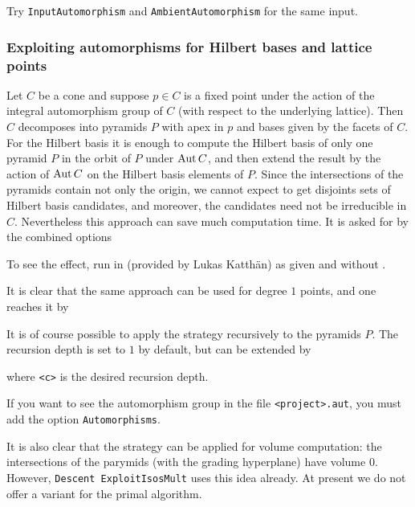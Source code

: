 Try \verb|InputAutomorphism| and \verb|AmbientAutomorphism| for the same input.

\subsubsection{Exploiting automorphisms for Hilbert bases and lattice points}

Let $C$ be a cone and suppose $p\in C$ is a fixed point under the action of the integral automorphism group of $C$ (with respect to the underlying lattice). Then $C$ decomposes into pyramids $P$ with apex in $p$ and bases given by the facets of $C$. For the Hilbert basis it is enough to compute the Hilbert basis of only one pyramid $P$ in the orbit of $P$ under $\operatorname{Aut} C$, and then extend the result by the action of $\operatorname{Aut} C$ on the Hilbert basis elements of $P$. Since the intersections of the pyramids contain not only the origin, we cannot expect to get disjoints sets of Hilbert basis candidates, and moreover, the candidates need not be irreducible in $C$. Nevertheless this approach can save much computation time. It is asked for by the combined options
\begin{itemize}
\end{itemize}
To see the effect, run  in  (provided by Lukas Katthän) as given and without .

It is clear that the same approach can be used for degree $1$ points, and one reaches it by
\begin{itemize}
\end{itemize}

It is of course possible to apply the strategy recursively  to the pyramids $P$. The recursion depth is set to $1$ by default, but can be extended by 
\begin{itemize}
\end{itemize}
where \verb*|<c>| is the desired recursion depth.

If you want to see the automorphism group in the file \verb|<project>.aut|, you must add the option \verb|Automorphisms|.

It is also clear that the strategy can be applied for volume computation: the intersections of the parymids (with the grading hyperplane) have volume $0$. However, \verb|Descent ExploitIsosMult| uses this idea already. At present we do not offer a variant for the primal algorithm.

